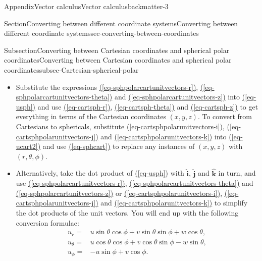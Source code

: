 \documentclass[oneside,10pt,]{book}
\newcommand{\xreffont}{\relax}
\newcommand{\ptxlistdisc}{\raisebox{0.3ex}{\textbullet}}
\newcommand{\ptxlistcircle}{\raisebox{0.3ex}{\textopenbullet}}
\numberwithin{equation}{section}
\begin{document}
\begin{appendixptx}{Appendix}{Vector calculus}{}{Vector calculus}{}{}{backmatter-3}
\begin{sectionptx}{Section}{Converting between different coordinate systems}{}{Converting between different coordinate systems}{}{}{sec-converting-between-coordinates}
\begin{subsectionptx}{Subsection}{Converting between Cartesian coordinates and spherical polar coordinates}{}{Converting between Cartesian coordinates and spherical polar coordinates}{}{}{subsec-Cartesian-spherical-polar}
\begin{itemize}[label=\ptxlistdisc]
\begin{itemize}[label=\ptxlistcircle]
\item{}Substitute the expressions \hyperref[eq-sphpolarcartunitvectors-r]{({\xreffont\ref{eq-sphpolarcartunitvectors-r}})}, \hyperref[eq-sphpolarcartunitvectors-theta]{({\xreffont\ref{eq-sphpolarcartunitvectors-theta}})} and \hyperref[eq-sphpolarcartunitvectors-z]{({\xreffont\ref{eq-sphpolarcartunitvectors-z}})} into \hyperref[eq-usph]{({\xreffont\ref{eq-usph}})} and use \hyperref[eq-cartsph-r]{({\xreffont\ref{eq-cartsph-r}})}, \hyperref[eq-cartsph-theta]{({\xreffont\ref{eq-cartsph-theta}})} and \hyperref[eq-cartsph-z]{({\xreffont\ref{eq-cartsph-z}})} to get everything in terms of the Cartesian coordinates \((x,y,z)\). To convert from Cartesians to sphericals, substitute \hyperref[eq-cartsphpolarunitvectors-i]{({\xreffont\ref{eq-cartsphpolarunitvectors-i}})}, \hyperref[eq-cartsphpolarunitvectors-j]{({\xreffont\ref{eq-cartsphpolarunitvectors-j}})} and  \hyperref[eq-cartsphpolarunitvectors-k]{({\xreffont\ref{eq-cartsphpolarunitvectors-k}})} into \hyperref[eq-ucart2]{({\xreffont\ref{eq-ucart2}})} and use \hyperref[eq-sphcart]{({\xreffont\ref{eq-sphcart}})} to replace any instances of \((x,y,z)\) with \((r,\theta,\phi)\).%
\item{}Alternatively, take the dot product of \hyperref[eq-usph]{({\xreffont\ref{eq-usph}})} with \(\hat{\boldsymbol{i}}\), \(\hat{\boldsymbol{j}}\) and \(\hat{\boldsymbol{k}}\) in turn, and use \hyperref[eq-sphpolarcartunitvectors-r]{({\xreffont\ref{eq-sphpolarcartunitvectors-r}})}, \hyperref[eq-sphpolarcartunitvectors-theta]{({\xreffont\ref{eq-sphpolarcartunitvectors-theta}})} and \hyperref[eq-sphpolarcartunitvectors-z]{({\xreffont\ref{eq-sphpolarcartunitvectors-z}})} or \hyperref[eq-cartsphpolarunitvectors-i]{({\xreffont\ref{eq-cartsphpolarunitvectors-i}})}, \hyperref[eq-cartsphpolarunitvectors-j]{({\xreffont\ref{eq-cartsphpolarunitvectors-j}})} and \hyperref[eq-cartsphpolarunitvectors-k]{({\xreffont\ref{eq-cartsphpolarunitvectors-k}})} to simplify the dot products of the unit vectors. You will end up with the following conversion formulae:%
\begin{align*}
u_r=&u\sin\theta\cos\phi+v\sin\theta\sin\phi+w\cos\theta,\\
u_\theta=&u\cos\theta\cos\phi+v\cos\theta\sin\phi-w\sin\theta,\\
u_\phi=&-u\sin\phi+v\cos\phi.
\end{align*}

\end{itemize}
\end{itemize}
\end{subsectionptx}
\end{sectionptx}
\end{appendixptx}
\end{document}

